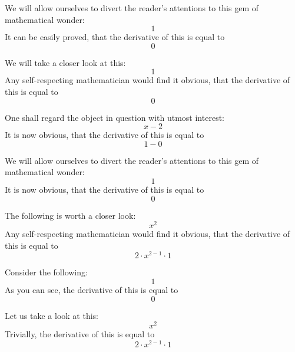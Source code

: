 \documentclass{article}
\begin{document}
We will allow ourselves to divert the reader's attentions to this gem of mathematical wonder:
\begin{equation}
1 
\end{equation}
It can be easily proved, that the derivative of this is equal to
\begin{equation}
0 
\end{equation}

We will take a closer look at this:
\begin{equation}
1 
\end{equation}
Any self-respecting mathematician would find it obvious, that the derivative of this is equal to
\begin{equation}
0 
\end{equation}

One shall regard the object in question with utmost interest:
\begin{equation}
x - 2 
\end{equation}
It is now obvious, that the derivative of this is equal to
\begin{equation}
1 - 0 
\end{equation}

We will allow ourselves to divert the reader's attentions to this gem of mathematical wonder:
\begin{equation}
1 
\end{equation}
It is now obvious, that the derivative of this is equal to
\begin{equation}
0 
\end{equation}

The following is worth a closer look:
\begin{equation}
x ^{2 } 
\end{equation}
Any self-respecting mathematician would find it obvious, that the derivative of this is equal to
\begin{equation}
2 \cdot x ^{2 - 1 } \cdot 1 
\end{equation}

Consider the following:
\begin{equation}
1 
\end{equation}
As you can see, the derivative of this is equal to
\begin{equation}
0 
\end{equation}

Let us take a look at this:
\begin{equation}
x ^{2 } 
\end{equation}
Trivially, the derivative of this is equal to
\begin{equation}
2 \cdot x ^{2 - 1 } \cdot 1 
\end{equation}
\end{document}
